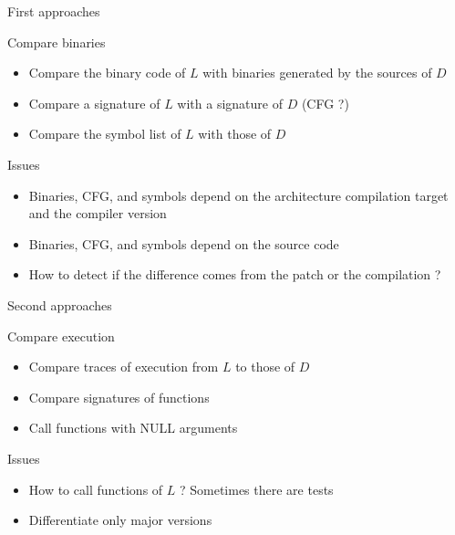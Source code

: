 \documentclass[11pt]{beamer}
\begin{document}
\begin{frame}{First approaches}

\begin{block}{Compare binaries}
	\begin{itemize}
		\item Compare the binary code of $L$ with binaries generated by the sources of $D$
		\item Compare a signature of $L$ with a signature of $D$ (CFG ?)
		\item Compare the symbol list of $L$ with those of $D$
	\end{itemize}
\end{block}

\begin{block}{Issues}
	\begin{itemize}
		\item Binaries, CFG, and symbols depend on the architecture compilation target and the compiler version
		\item Binaries, CFG, and symbols depend on the source code
		\item How to detect if the difference comes from the patch or the compilation ?
	\end{itemize}
\end{block}

\end{frame}



\begin{frame}{Second approaches}

\begin{block}{Compare execution}
	\begin{itemize}
		\item Compare traces of execution from $L$ to those of $D$ 
		\item Compare signatures of functions
		\item Call functions with NULL arguments
	\end{itemize}
\end{block}

\begin{block}{Issues}
	\begin{itemize}
		\item How to call functions of $L$ ? Sometimes there are tests
		\item Differentiate only major versions
	\end{itemize}
\end{block}


\end{frame}
\end{document}
